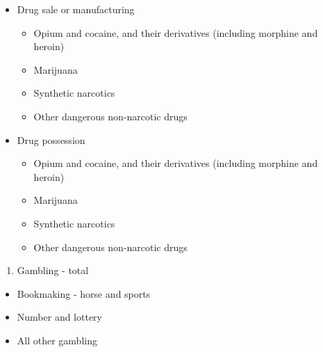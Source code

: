 \documentclass[
]{krantz}
\providecommand{\tightlist}{%
  \setlength{\itemsep}{0pt}\setlength{\parskip}{0pt}}
\begin{document}
\begin{itemize}
\tightlist
\item
  Drug sale or manufacturing

  \begin{itemize}
  \tightlist
  \item
    Opium and cocaine, and their derivatives (including
    morphine and heroin)
  \item
    Marijuana
  \item
    Synthetic narcotics
  \item
    Other dangerous non-narcotic drugs
  \end{itemize}
\item
  Drug possession

  \begin{itemize}
  \tightlist
  \item
    Opium and cocaine, and their derivatives (including
    morphine and heroin)
  \item
    Marijuana
  \item
    Synthetic narcotics
  \item
    Other dangerous non-narcotic drugs
  \end{itemize}
\end{itemize}

\begin{enumerate}
\def\labelenumi{\arabic{enumi}.}
\setcounter{enumi}{18}
\tightlist
\item
  Gambling - total
\end{enumerate}

\begin{itemize}
\tightlist
\item
  Bookmaking - horse and sports
\item
  Number and lottery
\item
  All other gambling
\end{itemize}
\end{document}
